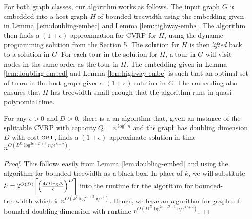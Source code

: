 \documentclass[twoside,leqno]{article}
\newcommand{\calT}{{\cal T}}
\newcommand{\opt}{\mbox{\sc opt}}
\newcommand{\OPT}{\mbox{\sc OPT}}
\newcommand{\eps}{\epsilon}
\DeclarePairedDelimiter\ceil{\lceil}{\rceil}
\newcommand{\cost}{\text{cost}}
\DeclarePairedDelimiter\autobracket{(}{)}
\newcommand{\br}[1]{\autobracket*{#1}}
\begin{document}
For both graph classes, our algorithm works as follows. The input graph $G$ is embedded into a host graph $H$ of bounded treewidth using the embedding given in Lemma \ref{lem:doubling-embed} and Lemma \ref{lem:highway-embe}. The algorithm then finds a $(1 + \eps)$-approximation for CVRP for $H$, using the dynamic programming solution from the Section 5. The solution for $H$ is then \emph{lifted} back to a solution in $G$. For each tour in the solution for $H$, a tour in $G$ will visit nodes in the same order as the tour in $H$. The embedding given in Lemma \ref{lem:doubling-embed} and Lemma \ref{lem:highway-embe} is such that an optimal set of tours in the host graph gives a $(1 + \eps)$ solution in $G$. The embedding also ensures that $H$ has treewidth small enough that the algorithm runs in quasi-polynomial time. \begin{comment}Suppose $\calT_1, \ldots, \calT_c$ are the set of tours in $\OPT$, let $E(\calT_i)$ be the edges denoting the order in which nodes are visited by $\calT_i$. Let $\cost(\calT_i)$ be the contribution of the tour $\calT_i$ towards $\opt$. We can write $\cost(\calT_i) = \sum_{uv \in E(\calT_i)} d(u,v)$ and we can write $\opt = \sum_{i = 1}^c \cost(\calT_i) = \sum_{i = 1}^c \sum_{uv \in E(\calT_i)} d(u,v)$. \end{comment}
\begin{theorem}
For any $\eps > 0$ and $D > 0$, there is a an algorithm that, given an instance of the splittable CVRP with capacity $Q = n^{\log^c n}$ and the graph has doubling dimension $D$ with cost $\opt$, finds a
$(1 + \eps)$-approximate solution in time
$n^{O(D^D \log^{2c + D + 3}n/\eps^{D+2})}$.
\end{theorem}
\begin{proof}
This follows easily from Lemma \ref{lem:doubling-embed} and using the algorithm for bounded-treewidth as a black box. In place of $k$, we will substitute $k = 2^{O(D)}\ceil*{\br{\frac{4D\log \Delta}{\eps}}^D}$ into the runtime for the algorithm for bounded-treewidth which is $n^{O(k^2 \log^{2c + 3}n/\eps^2)}$. Hence, we have an algorithm for graphs of bounded doubling dimension with runtime $n^{O(D^D \log^{2c + D + 3}n/\eps^{D+2})}$.
\end{proof}
\end{document}
